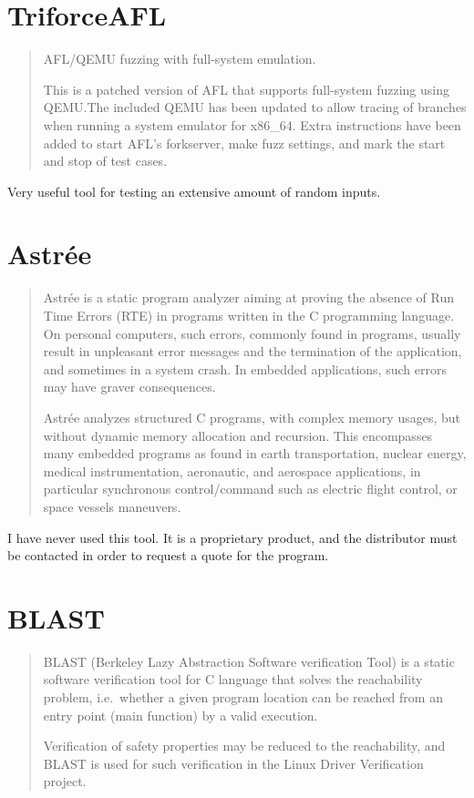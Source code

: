 \documentclass[12pt]{article}
\begin{document}
\section{TriforceAFL}
\begin{quote}
AFL/QEMU fuzzing with full-system emulation.

This is a patched version of AFL that supports full-system
fuzzing using QEMU.\@ The included QEMU has been updated to allow tracing
of branches when running a system emulator for x86\_64.
Extra instructions have been added to start AFL's forkserver,
make fuzz settings, and mark the start and stop of test cases.
\end{quote}

Very useful tool for testing an extensive amount of random inputs.
\cite{triforceafl}
\section{Astrée}
\begin{quote}
Astrée is a static program analyzer aiming at proving the absence of Run
Time Errors (RTE) in programs written in the C programming language.
On personal computers, such errors, commonly found in programs, usually
result in unpleasant error messages and the termination of the application,
and sometimes in a system crash. In embedded applications, such errors may
have graver consequences.

Astrée analyzes structured C programs, with complex memory usages, but
without dynamic memory allocation and recursion. This encompasses many
embedded programs as found in earth transportation, nuclear energy,
medical instrumentation, aeronautic, and aerospace applications, in
particular synchronous control/command such as electric flight control,
or space vessels maneuvers.
\end{quote}

I have never used this tool. It is a proprietary product, and the distributor
must be contacted in order to request a quote for the program.
\cite{astree}
\section{BLAST}
\begin{quote}
BLAST (Berkeley Lazy Abstraction Software verification Tool) is a static
software verification tool for C language that solves the reachability
problem, i.e.\ whether a given program location can be reached from an
entry point (main function) by a valid execution.

Verification of safety properties may be reduced to the reachability,
and BLAST is used for such verification in the Linux Driver Verification
project.
\end{quote}
\end{document}
